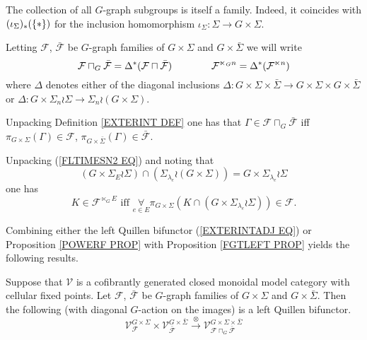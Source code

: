 \documentclass[a4paper,10pt]{article}%
\begin{document}
\begin{remark}
	The collection of all $G$-graph subgroups is itself a family. Indeed, it coincides with 
	$(\iota_{\Sigma})_{\**}(\{\**\})$
for the inclusion homomorphism 
$\iota_{\Sigma} \colon \Sigma \to G \times \Sigma$.
\end{remark}


\begin{notation}\label{SEMIDIRG NOT}
Letting $\mathcal{F}$, $\bar{\mathcal{F}}$ be $G$-graph families of $G \times \Sigma$ and $G \times \bar{\Sigma}$ we will write
\[
	\mathcal{F} \sqcap_G \bar{\mathcal{F}} 
	= \Delta^{\**} (\mathcal{F} \sqcap \bar{\mathcal{F}} )
\qquad \qquad
	\mathcal{F}^{\ltimes_G n} = \Delta^{\**} (\mathcal{F}^{\ltimes n})
\]
where $\Delta$ denotes either of the diagonal inclusions
$\Delta \colon 
G \times \Sigma \times \bar{\Sigma} \to 
G \times \Sigma \times G \times \bar{\Sigma}$
or 
$\Delta \colon G \times \Sigma_n \wr \Sigma \to 
\Sigma_n \wr (G \times \Sigma)$.
\end{notation}


\begin{remark}\label{UNPACKINGSQCAP REM}
	Unpacking Definition \ref{EXTERINT DEF} one has that 
	$\Gamma \in \mathcal{F} \sqcap_G \bar{\mathcal{F}}$ iff
	$\pi_{G \times \Sigma}(\Gamma) \in \mathcal{F}$,
	$\pi_{G \times \bar{\Sigma}}(\Gamma) \in \bar{\mathcal{F}}$.
\end{remark}


\begin{remark}\label{UNPACKINGLTIMES REM}
Unpacking (\ref{FLTIMESN2 EQ}) and noting that
\[
	\left(G \times \Sigma_E \wr \Sigma\right)
\cap
	\left(
	\Sigma_{\lambda_e} \wr (G \times \Sigma)
	\right)
=
	G \times \Sigma_{\lambda_e} \wr \Sigma
\]
 one has  
\begin{equation}\label{FLTIMESN2G EQ}
	K \in \mathcal{F}^{\ltimes_G E} 
	\text{ iff }
	\underset{e \in E}{\forall} \pi_{G \times \Sigma}
	\left(
		K \cap 
		\left(G \times \Sigma_{\lambda_e} \wr \Sigma \right)
	\right)
	\in \mathcal{F}.
\end{equation}
\end{remark}


Combining either the left Quillen bifunctor (\ref{EXTERINTADJ EQ}) or 
Proposition \ref{POWERF PROP}
with Proposition \ref{FGTLEFT PROP} yields the following results.


\begin{proposition}\label{EXTERINTADJG PROP}
Suppose that $\mathcal{V}$ is a cofibrantly generated closed monoidal model category with cellular fixed points.
Let $\mathcal{F}$, $\bar{\mathcal{F}}$ be $G$-graph families of 
$G \times \Sigma$ and $G \times \bar{\Sigma}$. Then the following (with diagonal $G$-action on the images) 
is a left Quillen bifunctor.
	\begin{equation}\label{EXTERINTADJG EQ}
	\mathcal{V}^{G \times \Sigma}_{\mathcal{F}}
		\times
	\mathcal{V}^{G \times \bar{\Sigma}}_{\bar{\mathcal{F}}}
		\xrightarrow{\otimes}
		\mathcal{V}^{G \times \Sigma \times \bar{\Sigma}}_{
	\mathcal{F} \sqcap_G \bar{\mathcal{F}}}
\end{equation}
\end{proposition}
\end{document}

